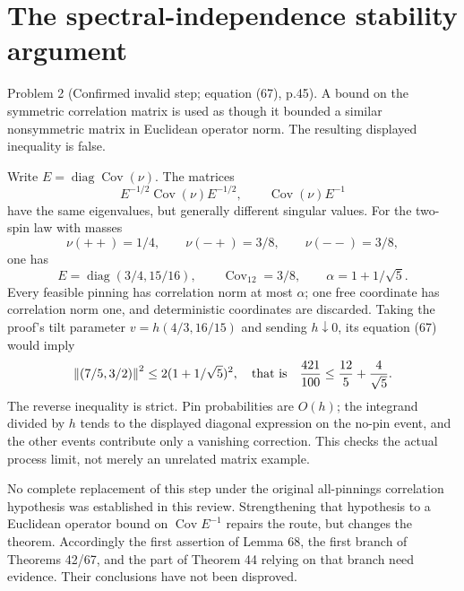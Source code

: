 \documentclass[10pt]{article}
\begin{document}
\section*{The spectral-independence stability argument}
Problem 2 (Confirmed invalid step; equation (67), p.45).  A bound on the symmetric correlation matrix is used as though it bounded a similar nonsymmetric matrix in Euclidean operator norm. The resulting displayed inequality is false.\par
Write \(E=\operatorname{diag}\operatorname{Cov}(\nu)\). The matrices \[E^{-1/2}\operatorname{Cov}(\nu)E^{-1/2},\qquad \operatorname{Cov}(\nu)E^{-1}\] have the same eigenvalues, but generally different singular values. For the two-spin law with masses \[\nu(++ )=1/4,\qquad \nu(-+)=3/8,\qquad \nu(--)=3/8,\] one has \[E=\operatorname{diag}(3/4,15/16),\qquad
 \operatorname{Cov}_{12}=3/8,\qquad
 \alpha=1+1/\sqrt5.\] Every feasible pinning has correlation norm at most \(\alpha\); one free coordinate has correlation norm one, and deterministic coordinates are discarded. Taking the proof’s tilt parameter \(v=h(4/3,16/15)\) and sending \(h\downarrow0\), its equation (67) would imply \[\left\|(7/5,3/2)\right\|^2
 \le 2(1+1/\sqrt5)^2,
 \quad\hbox{that is}\quad
 \frac{421}{100}\le\frac{12}{5}+\frac4{\sqrt5}.\] The reverse inequality is strict. Pin probabilities are \(O(h)\); the integrand divided by \(h\) tends to the displayed diagonal expression on the no-pin event, and the other events contribute only a vanishing correction. This checks the actual process limit, not merely an unrelated matrix example.\par
No complete replacement of this step under the original all-pinnings correlation hypothesis was established in this review. Strengthening that hypothesis to a Euclidean operator bound on \(\operatorname{Cov}E^{-1}\) repairs the route, but changes the theorem. Accordingly the first assertion of Lemma 68, the first branch of Theorems 42/67, and the part of Theorem 44 relying on that branch need evidence. Their conclusions have not been disproved.\par
\end{document}
